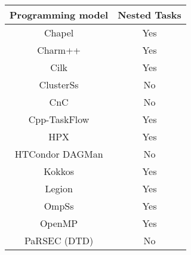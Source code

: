 \begin{tabular}{cc}
\hline
Programming model & Nested Tasks \\
\hline
Chapel & Yes\\
Charm++ & Yes\\
Cilk & Yes\\
ClusterSs & No\\
CnC & No\\
Cpp-TaskFlow & Yes\\
HPX & Yes\\
HTCondor DAGMan & No\\
Kokkos & Yes\\
Legion & Yes\\
OmpSs & Yes\\
OpenMP & Yes\\
PaRSEC (DTD) & No\\
\hline
\end{tabular}
